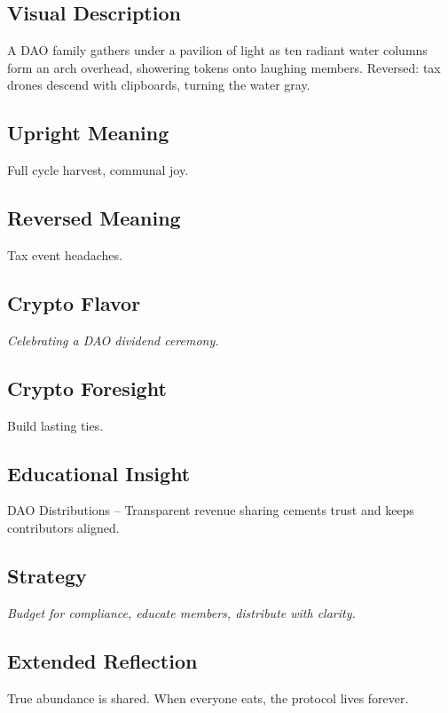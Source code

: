 \documentclass[11pt,oneside]{book}
\begin{document}
\begin{minipage}[t]{0.55\textwidth}
  \vspace{0pt}

  \subsection*{Visual Description}
  A DAO family gathers under a pavilion of light as ten radiant water columns form an arch overhead, showering tokens onto laughing members. Reversed: tax drones descend with clipboards, turning the water gray.

  \subsection*{Upright Meaning}
  Full cycle harvest, communal joy.

  \subsection*{Reversed Meaning}
  Tax event headaches.

  \subsection*{Crypto Flavor}
  \textit{Celebrating a DAO dividend ceremony.}

  \subsection*{Crypto Foresight}
  Build lasting ties.

  \subsection*{Educational Insight}
  DAO Distributions – Transparent revenue sharing cements trust and keeps contributors aligned.

  \subsection*{Strategy}
  \textit{Budget for compliance, educate members, distribute with clarity.}

  \subsection*{Extended Reflection}
  True abundance is shared. When everyone eats, the protocol lives forever.


\end{minipage}
\end{document}
